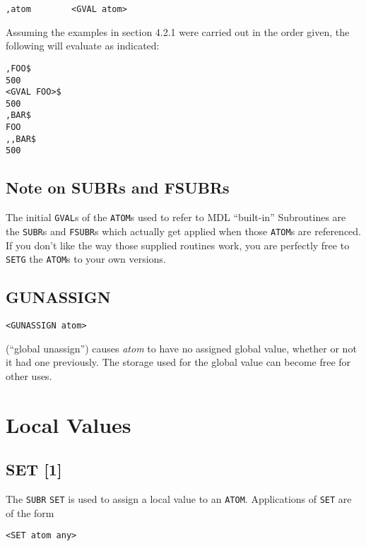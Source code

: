 \documentclass[a4paper]{scrbook}
\begin{document}
\begin{verbatim}
,atom        <GVAL atom>
\end{verbatim}

Assuming the examples in section 4.2.1 were carried out in the order given, the following will evaluate as indicated:

\begin{verbatim}
,FOO$
500
<GVAL FOO>$
500
,BAR$
FOO
,,BAR$
500
\end{verbatim}

\subsection{Note on SUBRs and FSUBRs}\label{note-on-subrs-and-fsubrs}

The initial \texttt{GVAL}s of the \texttt{ATOM}s used to refer to MDL ``built-in'' Subroutines are the
\texttt{SUBR}s and \texttt{FSUBR}s which actually get applied when those
\texttt{ATOM}s are referenced. If you don't like the way those supplied routines work, you are perfectly free to
\texttt{SETG} the \texttt{ATOM}s to your own versions.

\subsection{GUNASSIGN}\label{gunassign}

\begin{verbatim}
<GUNASSIGN atom>
\end{verbatim}

 (``global unassign'') causes \emph{atom} to have no assigned global value, whether or not
it had one previously. The storage used for the global value can become free for other uses.

\section{Local Values}\label{local-values}

\subsection{SET {[}1{]}}\label{set-1}

The \texttt{SUBR} \texttt{SET} is used to assign a local value to an \texttt{ATOM}. Applications
of \texttt{SET} are of the form

\begin{verbatim}
<SET atom any>
\end{verbatim}
\end{document}
